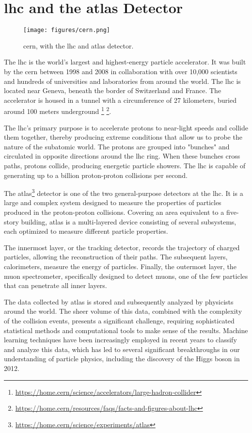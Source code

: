 \section{\gls{lhc} and the \gls{atlas} Detector}

\begin{figure}[h]
    \centering
    \texttt{[image: figures/cern.png]}
    \caption{\gls{cern}, with the \gls{lhc} and \gls{atlas} detector.}
    \label{fig:cern}
\end{figure}

The \gls{lhc} is the world's largest and highest-energy particle accelerator. It was built by the
\gls{cern} between 1998 and 2008 in collaboration with over 10,000 scientists and
hundreds of universities and laboratories from around the world. The \gls{lhc} is located near Geneva, beneath the border of
Switzerland and France. The accelerator is housed in a tunnel with a circumference of 27 kilometers, buried around 100
meters underground
\footnote{\url{https://home.cern/science/accelerators/large-hadron-collider}}
\footnote{\url{https://home.cern/resources/faqs/facts-and-figures-about-lhc}}.

The \gls{lhc}'s primary purpose is to accelerate protons to near-light speeds and collide them together, thereby producing
extreme conditions that allow us to probe the nature of the subatomic world. The protons are grouped into "bunches" and
circulated in opposite directions around the \gls{lhc} ring. When these bunches cross paths, protons collide, producing
energetic particle showers. The \gls{lhc} is capable of generating up to a billion proton-proton collisions per second.

The \gls{atlas}\footnote{\url{https://home.cern/science/experiments/atlas}} detector is one of the two general-purpose
detectors at the \gls{lhc}. It is a large and complex system designed to measure the properties of particles produced in
the proton-proton collisions. Covering an area equivalent to a five-story building, \gls{atlas} is a multi-layered
device consisting of several subsystems, each optimized to measure different particle properties.

The innermost layer, or the tracking detector, records the trajectory of charged particles, allowing the reconstruction
of their paths. The subsequent layers, calorimeters, measure the energy of particles. Finally, the outermost layer, the
muon spectrometer, specifically designed to detect muons, one of the few particles that can penetrate all inner layers.

The data collected by \gls{atlas} is stored and subsequently analyzed by physicists around the world. The sheer volume of this
data, combined with the complexity of the collision events, presents a significant challenge, requiring sophisticated
statistical methods and computational tools to make sense of the results. Machine learning techniques have been
increasingly employed in recent years to classify and analyze this data, which has led to several significant
breakthroughs in our understanding of particle physics, including the discovery of the Higgs boson in 2012.

